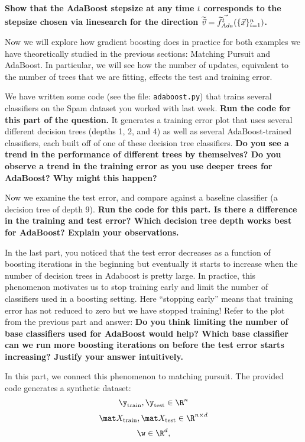\documentclass[preview]{standalone}
\begin{document}
\begin{Parts}
  {\bf Show that the AdaBoost stepsize at any time $t$ corresponds to the stepsize chosen via linesearch for the direction $\widetilde{\vec{v}} = \vec{\widetilde{f}^{t}_{Ada}}(\{\vec{x}\}_{i=1}^n)$.}

    

\Part Now we will explore how gradient boosting does in practice for both examples we have theoretically studied in the previous sections: Matching Pursuit and AdaBoost. In particular, we will see how the number of updates, equivalent to the number of trees that we are fitting, effects the test and training error.

 We have written some code (see the file: \texttt{adaboost.py}) that trains several classifiers on the Spam dataset you worked with last week. {\bf Run the code for this part of the question.} It generates a training error plot that uses several different decision trees (depths 1, 2, and 4) as well as several AdaBoost-trained classifiers, each built off of one of these decision tree classifiers. {\bf 
Do you see a trend in the performance of different trees by themselves?
Do you observe a trend in the training error as you use deeper trees for AdaBoost?
Why might this happen?}



\Part Now we examine the test error, and compare against a baseline classifier (a decision tree of depth 9). {\bf Run the code for this part. Is there a difference in the training and test error? Which decision tree depth works best for AdaBoost? Explain your observations.}




\Part
In the last part, you noticed that the test error decreases as a function of boosting iterations in the beginning but eventually it starts to increase when the number of decision trees in Adaboost is pretty large. 
In practice, this phenomenon motivates us to stop training early and limit the number of classifiers used in a boosting setting. 
Here ``stopping early'' means that training error has not reduced to
zero but we have stopped training! Refer to the plot from the
  previous part and answer: {\bf Do you think limiting the number of base classifiers used for AdaBoost would help? Which base classifier can we run more boosting iterations on before the test error starts increasing? Justify your answer intuitively.}



\Part

In this part, we connect this phenomenon to matching pursuit. The
provided code generates a synthetic dataset: 
$$\y_{\text{train}}, \y_{\text{test}} \in \R^n$$
$$\mat X_{\text{train}}, \mat X_{\text{test}} \in \R^{n\times d}$$
$$\w \in \R^d,$$


\end{Parts}
\end{document}
